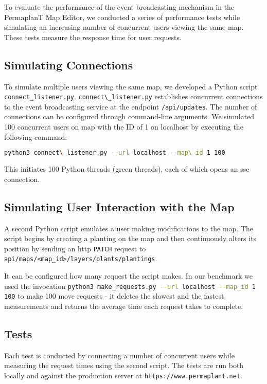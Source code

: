 \documentclass[final,oneside]{vutinfth}
\newcommand{\bashsnippet}[1]{\lstinline[language=bash]{#1}}
\newcommand{\urlsnippet}[1]{\lstinline[language=url]{#1}}
\begin{document}
To evaluate the performance of the event broadcasting mechanism in the PermaplanT Map Editor, we conducted a series of performance tests while simulating an increasing number of concurrent users viewing the same map.
These tests measure the response time for user requests.

\subsection{Simulating Connections}
To simulate multiple users viewing the same map, we developed a Python script \bashsnippet{connect_listener.py}.
\bashsnippet{connect\_listener.py} establishes concurrent connections to the event broadcasting service at the endpoint \urlsnippet{/api/updates}.
The number of connections can be configured through command-line arguments.
We simulated 100 concurrent users on map with the ID of 1 on localhost by executing the following command: 
\begin{lstlisting}[language=bash]
python3 connect\_listener.py --url localhost --map\_id 1 100
\end{lstlisting}
This initiates 100 Python threads (green threads), each of which opens an \gls{sse} connection.  

\subsection{Simulating User Interaction with the Map}
A second Python script emulates a user making modifications to the map.
The script begins by creating a planting on the map and then continuously alters its position by sending an \gls{http} \texttt{PATCH} request to \urlsnippet{api/maps/<map_id>/layers/plants/plantings}.

It can be configured how many request the script makes.
In our benchmark we used the invocation \bashsnippet{python3 make_requests.py --url localhost --map_id 1 100} to make
100 move requests - it deletes the slowest and the fastest measurements and returns the average time each request takes to complete.
    
\subsection{Tests}

Each test is conducted by connecting a number of concurrent users while measuring the request times using the second script. The tests are run both locally and against the production server at \urlsnippet{https://www.permaplant.net}.
\end{document}
